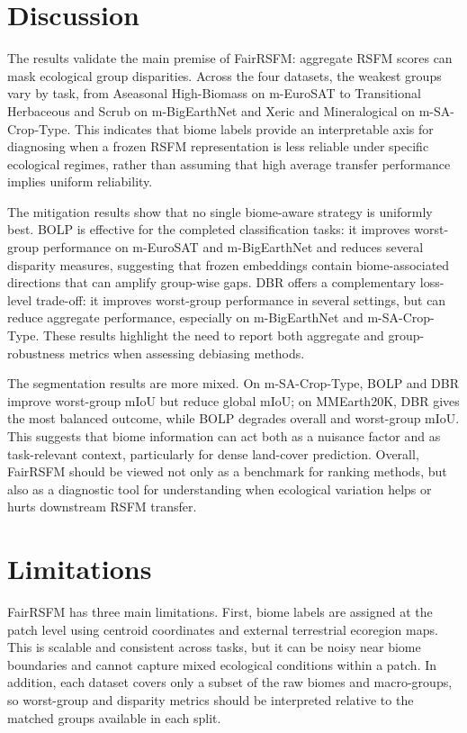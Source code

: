 \documentclass[10pt,twocolumn,letterpaper]{article}
\newcommand{\method}{FairRSFM\xspace}
\begin{document}
\section{Discussion}

The results validate the main premise of \method: aggregate RSFM scores can mask ecological group disparities. Across the four datasets, the weakest groups vary by task, from Aseasonal High-Biomass on m-EuroSAT to Transitional Herbaceous and Scrub on m-BigEarthNet and Xeric and Mineralogical on m-SA-Crop-Type. This indicates that biome labels provide an interpretable axis for diagnosing when a frozen RSFM representation is less reliable under specific ecological regimes, rather than assuming that high average transfer performance implies uniform reliability.

The mitigation results show that no single biome-aware strategy is uniformly best. BOLP is effective for the completed classification tasks: it improves worst-group performance on m-EuroSAT and m-BigEarthNet and reduces several disparity measures, suggesting that frozen embeddings contain biome-associated directions that can amplify group-wise gaps. DBR offers a complementary loss-level trade-off: it improves worst-group performance in several settings, but can reduce aggregate performance, especially on m-BigEarthNet and m-SA-Crop-Type. These results highlight the need to report both aggregate and group-robustness metrics when assessing debiasing methods.

The segmentation results are more mixed. On m-SA-Crop-Type, BOLP and DBR improve worst-group mIoU but reduce global mIoU; on MMEarth20K, DBR gives the most balanced outcome, while BOLP degrades overall and worst-group mIoU. This suggests that biome information can act both as a nuisance factor and as task-relevant context, particularly for dense land-cover prediction. Overall, \method should be viewed not only as a benchmark for ranking methods, but also as a diagnostic tool for understanding when ecological variation helps or hurts downstream RSFM transfer.

\section{Limitations}

\method has three main limitations. First, biome labels are assigned at the patch level using centroid coordinates and external terrestrial ecoregion maps. This is scalable and consistent across tasks, but it can be noisy near biome boundaries and cannot capture mixed ecological conditions within a patch. In addition, each dataset covers only a subset of the raw biomes and macro-groups, so worst-group and disparity metrics should be interpreted relative to the matched groups available in each split.
\end{document}
